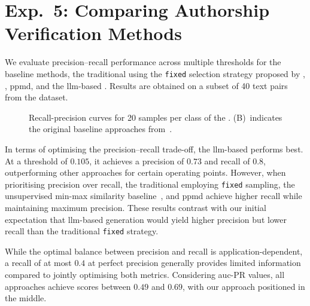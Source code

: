 \section{Exp.\ 5: Comparing Authorship Verification Methods}%
\label{sec:imp_gen_res}

We evaluate precision–recall performance across multiple thresholds for the baseline methods, the traditional \impAppr{} using the \texttt{fixed} \imp{} selection strategy proposed by \citet{koppel_determining_2014}, \unmasking{}, \ac{ppmd}, and the \ac{llm}-based \impAppr{}.
Results are obtained on a subset of 40 text pairs from the \dataStudent{} dataset.

\begin{figure}[htbp]
    \centering
    
    \caption[Recall-precision curves for the \dataStudent{}]{
        Recall-precision curves for 20 samples per class of the \dataStudent{}. 
        (B)~indicates the original baseline approaches from~\citep{koppel_determining_2014}.
    }
    \label{fig:comp_naive_student}
\end{figure}

In terms of optimising the precision–recall trade-off, the \ac{llm}-based \impAppr{} performs best. 
At a threshold of $0.105$, it achieves a precision of $0.73$ and recall of $0.8$, outperforming other approaches for certain operating points. 
However, when prioritising precision over recall, the traditional \impAppr{} employing \texttt{fixed} \imp{} sampling, the unsupervised min-max similarity baseline~\citep{koppel_determining_2014}, and \ac{ppmd} achieve higher recall while maintaining maximum precision. These results contrast with our initial expectation that \ac{llm}-based \imp{} generation would yield higher precision but lower recall than the traditional \texttt{fixed} strategy.

While the optimal balance between precision and recall is application-dependent, a recall of at most $0.4$ at perfect precision generally provides limited information compared to jointly optimising both metrics. Considering \ac{auc}-PR values, all approaches achieve scores between $0.49$ and $0.69$, with our approach positioned in the middle.

